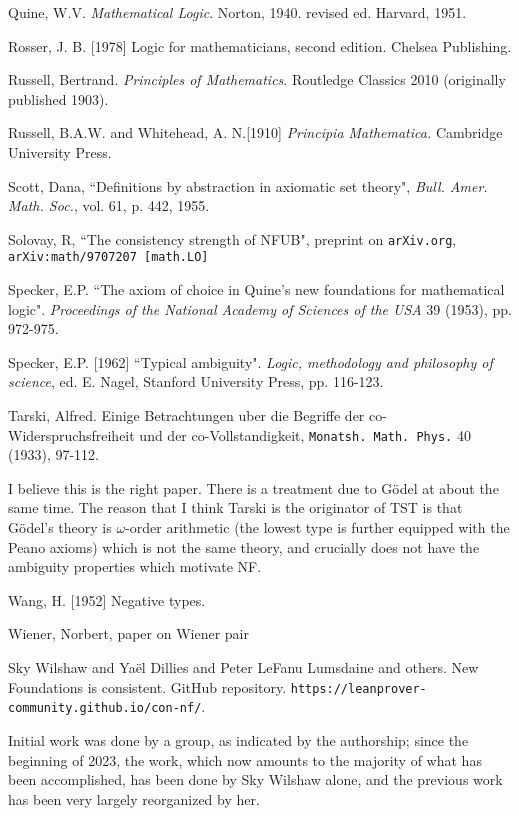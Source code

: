 \documentclass[112pt]{article}
\begin{document}
\begin{thebibliography}{99}
  Quine, W.V.  {\em Mathematical Logic\/}.  Norton, 1940.  revised ed. Harvard, 1951.

  Rosser, J. B. [1978] 
Logic for mathematicians, second edition. 
Chelsea Publishing.

  Russell, Bertrand.  {\em Principles of Mathematics\/}.  Routledge Classics 2010 (originally published 1903).

  Russell, B.A.W. and Whitehead, A. N.[1910]
{\em Principia Mathematica.\/} Cambridge University Press. 

  Scott, Dana, ``Definitions by abstraction in axiomatic set theory",  {\em Bull. Amer. Math.
Soc.}, vol. 61, p. 442, 1955.

  Solovay, R, ``The consistency strength of NFUB",  preprint on {\tt arXiv.org}, {\tt arXiv:math/9707207 [math.LO]}

  Specker, E.P.
``The axiom of choice in Quine's new foundations for mathematical logic". 
{\em Proceedings of the National Academy of Sciences of the USA\/} 39 (1953), pp. 972-975.

  Specker, E.P. [1962] 
``Typical ambiguity". 
{\em Logic, methodology and philosophy of science\/}, ed. E. Nagel, Stanford University Press, pp. 116-123.

  Tarski, Alfred.  Einige Betrachtungen uber die Begriffe der co-Widerspruchsfreiheit und der co-Vollstandigkeit,
{\tt Monatsh. Math. Phys.\/} 40 (1933), 97-112. 

I believe this is the right paper.  There is a treatment due to G\"odel at about the same time.  The reason that I think Tarski is the originator of TST is that G\"odel's theory is $\omega$-order arithmetic (the lowest type is further equipped with the Peano axioms) which is not the same theory, and crucially does not have the ambiguity properties which motivate NF.

  Wang, H. [1952] 
Negative types.

  Wiener, Norbert, paper on Wiener pair

  Sky Wilshaw and Yaël Dillies and Peter LeFanu Lumsdaine and others. New Foundations is consistent. GitHub repository. {\tt https://leanprover-community.github.io/con-nf/}.

Initial work was done by a group, as indicated by the authorship;  since the beginning of 2023, the work, which now amounts to the majority of what has been accomplished, has been done by Sky Wilshaw alone, and the previous work has been very largely reorganized by her.


\end{thebibliography}
\end{document}

